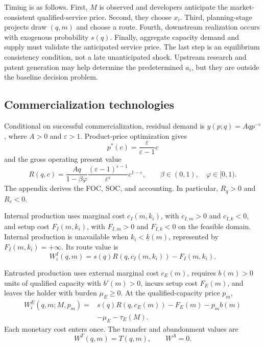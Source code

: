 \documentclass[12pt]{article}
\newcommand{\1}{\mathbf{1}}
\begin{document}
Timing is as follows. First, \(M\) is observed and developers anticipate the
market-consistent qualified-service price. Second, they choose \(x_i\).
Third, planning-stage projects draw \((q,m)\) and choose a route. Fourth,
downstream realization occurs with exogenous probability \(s(q)\). Finally,
aggregate capacity demand and supply must validate the anticipated service
price. The last step is an equilibrium consistency condition, not a late
unanticipated shock. Upstream research and patent generation may help
determine the predetermined \(a_i\), but they are outside the baseline
decision problem.

\subsection{Commercialization technologies}
\label{subsec:p16m-technologies}

Conditional on successful commercialization, residual demand is
\(y(p;q)=Aqp^{-\varepsilon}\), where \(A>0\) and \(\varepsilon>1\).
Product-price optimization gives
\[
  p^*(c)=\frac{\varepsilon}{\varepsilon-1}c
\]
and the gross operating present value
\begin{equation}
  R(q,c)
  =
  \frac{Aq}{1-\beta\varphi}
  \frac{(\varepsilon-1)^{\varepsilon-1}}
       {\varepsilon^\varepsilon}
  c^{1-\varepsilon},
  \qquad
  \beta\in(0,1),\quad \varphi\in[0,1).
  \label{eq:p16m-return}
\end{equation}
The appendix derives the FOC, SOC, and accounting. In particular,
\(R_q>0\) and \(R_c<0\).

Internal production uses marginal cost \(c_I(m,k_i)\), with
\(c_{I,m}>0\) and \(c_{I,k}<0\), and setup cost \(F_I(m,k_i)\), with
\(F_{I,m}>0\) and \(F_{I,k}<0\) on the feasible domain. Internal production
is unavailable when \(k_i<\underline{k}(m)\), represented by
\(F_I(m,k_i)=+\infty\). Its route value is
\begin{equation}
  W_i^I(q,m)
  =
  s(q)R\!\left(q,c_I(m,k_i)\right)-F_I(m,k_i).
  \label{eq:p16m-internal}
\end{equation}

Entrusted production uses external marginal cost \(c_E(m)\), requires
\(b(m)>0\) units of qualified capacity with \(b'(m)>0\), incurs setup cost
\(F_E(m)\), and leaves the holder with burden \(\mu_E\geq0\). At the
qualified-capacity price \(p_m\),
\begin{equation}
  \begin{aligned}
  W_i^E(q,m;M,p_m)
  ={}&
  s(q)R\!\left(q,c_E(m)\right)-F_E(m)-p_mb(m)\\
  &-\mu_E-\tau_E(M).
  \end{aligned}
  \label{eq:p16m-entrusted}
\end{equation}
Each monetary cost enters once. The transfer and abandonment values are
\begin{equation}
  W^T(q,m)=T(q,m),
  \qquad
  W^A=0.
  \label{eq:p16m-outside}
\end{equation}
\end{document}
